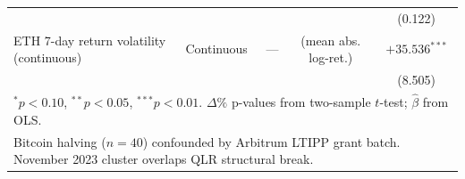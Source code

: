 \begin{table}[ht]
\begin{tabular}{lcccccc}
  & & & & & & (0.122) \\
  ETH 7-day return volatility (continuous) & Continuous & — & \multicolumn{3}{c}{(mean abs. log-ret.)} & $+35.536^{***}$ \\
  & & & & & & (8.505) \\
\hline\hline
\multicolumn{7}{l}{\footnotesize $^*p<0.10$, $^{**}p<0.05$, $^{***}p<0.01$. $\Delta\%$ p-values from two-sample $t$-test; $\hat{\beta}$ from OLS.} \\
\multicolumn{7}{l}{\footnotesize Bitcoin halving ($n=40$) confounded by Arbitrum LTIPP grant batch. November 2023 cluster overlaps QLR structural break.} \\
\end{tabular}
\end{table}
